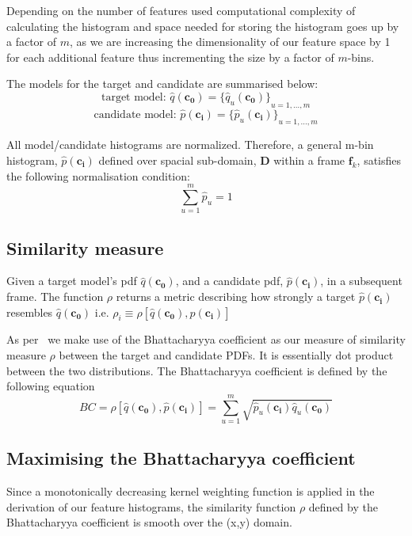 Depending on the number of features used computational complexity of calculating
the histogram and space needed for storing the histogram goes up by a factor of
$m$, as we are increasing the dimensionality of our feature space by 1 for each
additional feature thus incrementing the size by a factor of $m$-bins.

The models for the target and candidate are summarised below:
\[\text{target model: }  \hat{q}(\mathbf{c_0}) = {\{\hat{q}_u(\mathbf{c_0})\}}_{u=1,\ldots,m}\]
\[\text{candidate model: }  \hat{p}(\mathbf{c_i}) = {\{\hat{p}_u(\mathbf{c_i})\}}_{u=1,\ldots,m}\]

All model/candidate histograms are normalized. Therefore, a general m-bin
histogram, $\hat{p}(\mathbf{c_i})$ defined over spacial sub-domain, $\mathbf{D}$
within a frame $\mathbf{f}_k$, satisfies the following normalisation condition:
\[\sum_{u=1}^{m}\hat{p}_u = 1\]

\subsection{Similarity measure}
Given a target model's pdf $\hat{q}(\mathbf{c_0})$, and a candidate pdf,
$\hat{p}(\mathbf{c_i})$, in a subsequent frame.  The function $\rho$ returns a
metric describing how strongly a target $\hat{p}(\mathbf{c_i})$ resembles
$\hat{q}(\mathbf{c_0})$ i.e.
$\rho_i \equiv \rho[\hat{q}(\mathbf{c_0}),\hat{p}(\mathbf{c_i})]$

As per~\cite{Comaniciu2003} we make use of the Bhattacharyya coefficient as our
measure of similarity measure $\rho$ between the target and candidate PDFs. It
is essentially dot product between the two distributions. The
Bhattacharyya coefficient is defined by the following equation
\begin{equation}\label{eqn:bhattacharyya}
    BC = \rho[\hat{q}(\mathbf{c_0}),\hat{p}(\mathbf{c_i})]=\sum_{u=1}^{m}\sqrt{\hat{p}_u(\mathbf{c_i})\hat{q}_u(\mathbf{c_0})}
\end{equation}

\subsection{Maximising the Bhattacharyya coefficient}\label{maximising_bhat}
Since a monotonically decreasing kernel weighting function is applied in the
derivation of our feature histograms, the similarity function $\rho$ defined by the
Bhattacharyya coefficient is smooth over the (x,y) domain.


